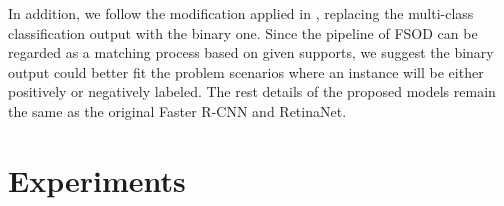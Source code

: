 \documentclass[journal]{IEEEtran}
\begin{document}
In addition, we follow the modification applied in \cite{fan2020few}, replacing the multi-class classification output with the binary one.
Since the pipeline of FSOD can be regarded as a matching process based on given supports, we suggest the binary output could better fit the problem scenarios where an instance will be either positively or negatively labeled.
The rest details of the proposed models remain the same as the original Faster R-CNN and RetinaNet.
\begin{table}[t!]
    \centering
    \caption{The performance on novel categories of COCO. All the models are trained on base categories and then fine-tuned on a small set of novel samples ($e.g.$, 10 shots of each category). After fine-tuning, models will be evaluated on the novel classes. ``-'': no reported results. 
    }
    \label{tab:reported}
\end{table}



\section{Experiments}
\end{document}

